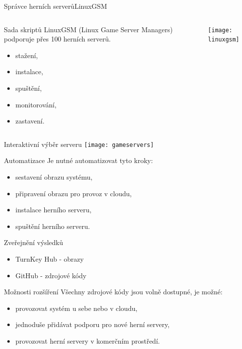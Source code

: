 \documentclass[czech,aspectratio=169]{beamer}
\begin{document}
  \begin{frame}{Správce herních serverů}{LinuxGSM}
    \begin{columns}
      \begin{column}{.6\textwidth}
        Sada skriptů LinuxGSM (Linux Game Server Managers) podporuje přes 100 herních serverů.
        \begin{itemize}
          \item stažení,
          \item instalace,
          \item spuštění,
          \item monitorování,
          \item zastavení.
        \end{itemize}
      \end{column}
      \begin{column}{.3\textwidth}
          \texttt{[image: linuxgsm]}
      \end{column}
    \end{columns}
  \end{frame}

  \begin{frame}{Interaktivní výběr serveru}
    \centering
    \texttt{[image: gameservers]}
  \end{frame}

  \begin{frame}{Automatizace}
    Je nutné automatizovat tyto kroky:
    \begin{itemize}
      \item sestavení obrazu systému, \pause
      \item připravení obrazu pro provoz v cloudu, \pause
      \item instalace herního serveru, \pause
      \item spuštění herního serveru.
    \end{itemize}
  \end{frame}

  \begin{frame}{Zveřejnění výsledků}
    \begin{itemize}
      \item TurnKey Hub - obrazy
      \item GitHub - zdrojové kódy
    \end{itemize}
  \end{frame}

  \begin{frame}{Možnosti rozšíření}
    Všechny zdrojové kódy jsou volně dostupné, je možné:
    \begin{itemize}
      \item provozovat systém u sebe nebo v cloudu,
      \item jednoduše přidávat podporu pro nové herní servery,
      \item provozovat herní servery v komerčním prostředí.
    \end{itemize}
  \end{frame}
\end{document}
